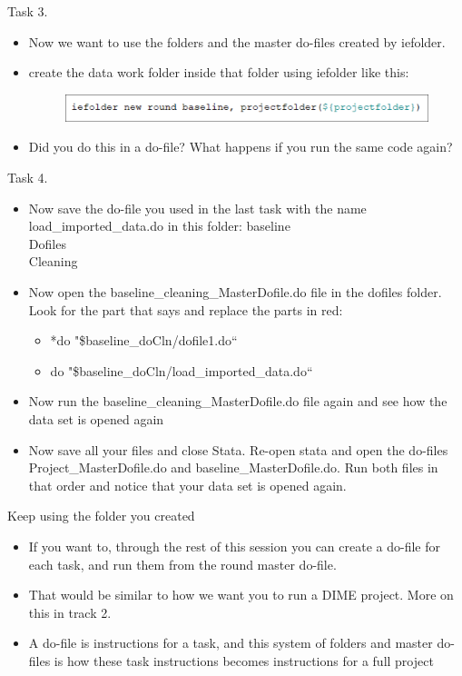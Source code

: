 \documentclass[aspectratio=169]{beamer}
\begin{document}
\begin{frame}{Task 3.}
\begin{itemize}
	\item Now we want to use the folders and the master do-files created by iefolder.
	\item create the data work folder inside that folder using iefolder like this:
	\begin{figure}
		\centering
		\includegraphics[width=\linewidth]{img/task2}
	\end{figure}
	\item Did you do this in a do-file? What happens if you run the same code again?
\end{itemize}
\end{frame}

\begin{frame}{Task 4.}
\begin{itemize}
	\item Now save the do-file you used in the last task with the name load\_imported\_data.do in this folder: baseline\\Dofiles\\Cleaning
	\item Now open the baseline\_cleaning\_MasterDofile.do file in the dofiles folder. Look for the part that says and replace the parts in red:
		\begin{itemize}
			\item 	*do "\$baseline\_doCln/dofile1.do“
			\item do "\$baseline\_doCln/load\_imported\_data.do“
		\end{itemize}
	\item Now run the baseline\_cleaning\_MasterDofile.do  file again and see how the data set is opened again
	\item Now save all your files and close Stata. Re-open stata and open the do-files Project\_MasterDofile.do and baseline\_MasterDofile.do. Run both files in that order and notice that your data set is opened again. 
\end{itemize}
\end{frame}



\begin{frame}{Keep using the folder you created}
\begin{itemize}
	\item If you want to, through the rest of this session you can create a do-file for each task, and run them from the round master do-file.	
	\item That would be similar to how we want you to run a DIME project. More on this in track 2.
	\item A do-file is instructions for a task, and this system of folders and master do-files is how these task instructions becomes instructions for a full project 
\end{itemize}
\end{frame}
\end{document}
